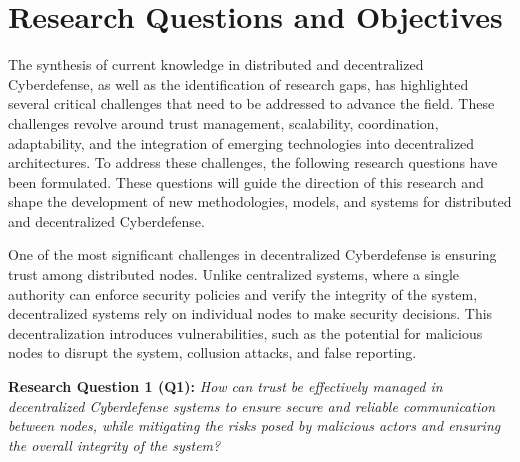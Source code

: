


\section{Research Questions and Objectives}

The synthesis of current knowledge in distributed and decentralized Cyberdefense, as well as the identification of research gaps, has highlighted several critical challenges that need to be addressed to advance the field. These challenges revolve around trust management, scalability, coordination, adaptability, and the integration of emerging technologies into decentralized architectures. To address these challenges, the following research questions have been formulated. These questions will guide the direction of this research and shape the development of new methodologies, models, and systems for distributed and decentralized Cyberdefense.


One of the most significant challenges in decentralized Cyberdefense is ensuring trust among distributed nodes. Unlike centralized systems, where a single authority can enforce security policies and verify the integrity of the system, decentralized systems rely on individual nodes to make security decisions. This decentralization introduces vulnerabilities, such as the potential for malicious nodes to disrupt the system, collusion attacks, and false reporting.

\textbf{Research Question 1 (Q1):} \textit{How can trust be effectively managed in decentralized Cyberdefense systems to ensure secure and reliable communication between nodes, while mitigating the risks posed by malicious actors and ensuring the overall integrity of the system?}

